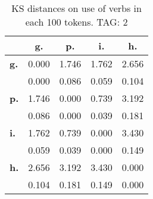 \begin{table}[h!]
\begin{center}
\begin{tabular}{| l || c | c | c | c |}\hline
 & {\bf g.} & {\bf p.} & {\bf i.} & {\bf h.} \\\hline\hline
{\bf g.} & 0.000 & 1.746 & 1.762 & 2.656 \\
{\bf } & 0.000 & 0.086 & 0.059 & 0.104 \\\hline
{\bf p.} & 1.746 & 0.000 & 0.739 & 3.192 \\
{\bf } & 0.086 & 0.000 & 0.039 & 0.181 \\\hline
{\bf i.} & 1.762 & 0.739 & 0.000 & 3.430 \\
{\bf } & 0.059 & 0.039 & 0.000 & 0.149 \\\hline
{\bf h.} & 2.656 & 3.192 & 3.430 & 0.000 \\
{\bf } & 0.104 & 0.181 & 0.149 & 0.000 \\\hline
\end{tabular}
\caption{KS distances on use of verbs in each 100 tokens. TAG: 2}
\end{center}
\end{table}